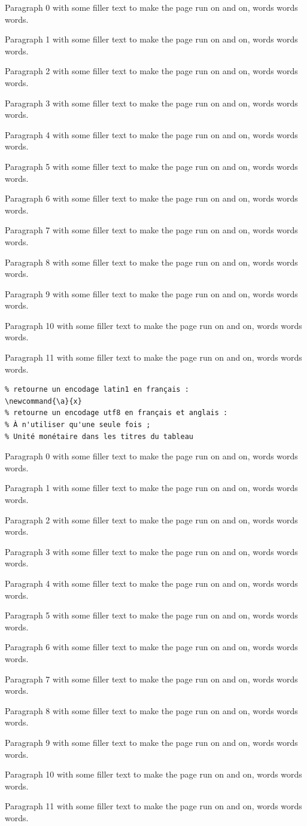 \documentclass{article}
\begin{document}
Paragraph 0 with some filler text to make the page run on and on, words words words.

Paragraph 1 with some filler text to make the page run on and on, words words words.

Paragraph 2 with some filler text to make the page run on and on, words words words.

Paragraph 3 with some filler text to make the page run on and on, words words words.

Paragraph 4 with some filler text to make the page run on and on, words words words.

Paragraph 5 with some filler text to make the page run on and on, words words words.

Paragraph 6 with some filler text to make the page run on and on, words words words.

Paragraph 7 with some filler text to make the page run on and on, words words words.

Paragraph 8 with some filler text to make the page run on and on, words words words.

Paragraph 9 with some filler text to make the page run on and on, words words words.

Paragraph 10 with some filler text to make the page run on and on, words words words.

Paragraph 11 with some filler text to make the page run on and on, words words words.
\begin{lstlisting}
% retourne un encodage latin1 en français :
\newcommand{\a}{x}
% retourne un encodage utf8 en français et anglais :
% À n'utiliser qu'une seule fois ;
% Unité monétaire dans les titres du tableau
\end{lstlisting}
Paragraph 0 with some filler text to make the page run on and on, words words words.

Paragraph 1 with some filler text to make the page run on and on, words words words.

Paragraph 2 with some filler text to make the page run on and on, words words words.

Paragraph 3 with some filler text to make the page run on and on, words words words.

Paragraph 4 with some filler text to make the page run on and on, words words words.

Paragraph 5 with some filler text to make the page run on and on, words words words.

Paragraph 6 with some filler text to make the page run on and on, words words words.

Paragraph 7 with some filler text to make the page run on and on, words words words.

Paragraph 8 with some filler text to make the page run on and on, words words words.

Paragraph 9 with some filler text to make the page run on and on, words words words.

Paragraph 10 with some filler text to make the page run on and on, words words words.

Paragraph 11 with some filler text to make the page run on and on, words words words.
\end{document}
